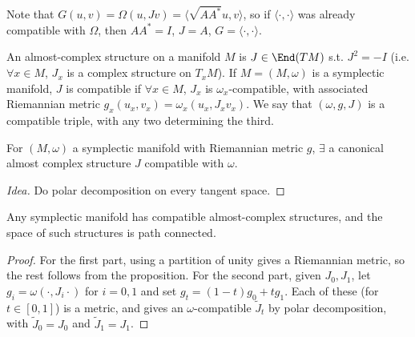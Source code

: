 \begin{remark}
Note that $G(u,v)=\Omega(u,Jv)=\langle\sqrt{AA^*}u,v\rangle$, so if $\langle\cdot,\cdot\rangle$ was already compatible with $\Omega$, then $AA^*=I$, $J=A$, $G=\langle\cdot,\cdot\rangle$.
\end{remark}
\begin{definition}
An almost-complex structure on a manifold $M$ is $J\in\End(TM)$ s.t. $J^2=-I$ (i.e. $\forall x\in M$, $J_x$ is a complex structure on $T_xM$). If $M=(M,\omega)$ is a symplectic manifold, $J$ is compatible if $\forall x\in M$, $J_x$ is $\omega_x$-compatible, with associated Riemannian metric $g_x(u_x,v_x)=\omega_x(u_x,J_xv_x)$. We say that $(\omega,g,J)$ is a compatible triple, with any two determining the third.
\end{definition}
\begin{proposition}
For $(M,\omega)$ a symplectic manifold with Riemannian metric $g$, $\exists$ a canonical almost complex structure $J$ compatible with $\omega$.
\end{proposition}
\begin{proof}[Idea]
Do polar decomposition on every tangent space.
\end{proof}
\begin{corollary}
Any symplectic manifold has compatible almost-complex structures, and the space of such structures is path connected.
\end{corollary}
\begin{proof}
For the first part, using a partition of unity gives a Riemannian metric, so the rest follows from the proposition. For the second part, given $J_0,J_1$, let $g_i=\omega(\cdot,J_i\cdot)$ for $i=0,1$ and set $g_t=(1-t)g_0+tg_1$. Each of these (for $t\in[0,1]$) is a metric, and gives an $\omega$-compatible $\widetilde J_t$ by polar decomposition, with $\widetilde J_0=J_0$ and $\widetilde J_1=J_1$.
\end{proof}

